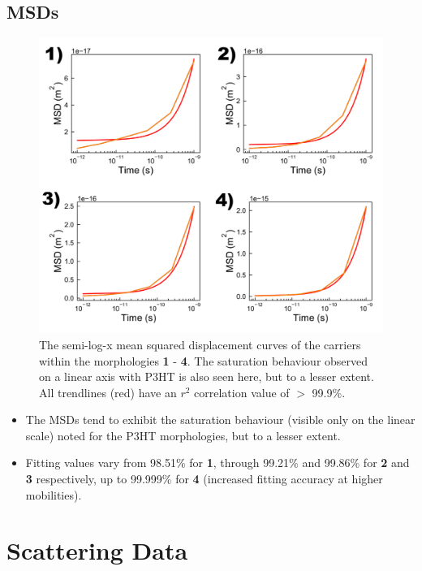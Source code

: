 \documentclass[12pt]{article}
\begin{document}
\clearpage


\subsection{MSDs}


\begin{figure}[h!]\centering
	\includegraphics[width=\textwidth]{Figures/MSD.pdf}
    \caption{The semi-log-x mean squared displacement curves of the carriers within the morphologies \textbf{1} - \textbf{4}.
    The saturation behaviour observed on a linear axis with P3HT is also seen here, but to a lesser extent.
    All trendlines (red) have an $r^{2}$ correlation value of $>$ 99.9\%.}
	\label{fig:MSD}
\end{figure}


\begin{itemize}
    \item{The MSDs tend to exhibit the saturation behaviour (visible only on the linear scale) noted for the P3HT morphologies, but to a lesser extent.}
    \item{Fitting values vary from 98.51\% for \textbf{1}, through 99.21\% and 99.86\% for \textbf{2} and \textbf{3} respectively, up to 99.999\% for \textbf{4} (increased fitting accuracy at higher mobilities).} 
\end{itemize}


\clearpage


\section{Scattering Data}
 
\end{document}
